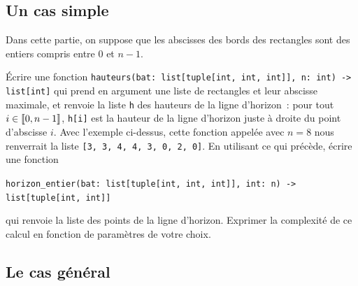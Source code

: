\documentclass{magnolia}
\begin{document}
\subsection{Un cas simple}

Dans cette partie, on suppose que les abscisses des bords des rectangles sont des entiers compris entre
0 et $n-1$.
\begin{questions}
\question Écrire une fonction \verb!hauteurs(bat: list[tuple[int, int, int]], n: int) -> list[int]! qui prend
  en argument une liste de rectangles et leur abscisse maximale, et renvoie la liste \verb!h! des hauteurs de la
  ligne d'horizon~: pour tout $i\in\left\llbracket 0,n-1\right\rrbracket$, \verb!h[i]! est la hauteur de la ligne d'horizon
  juste à droite du point d'abscisse $i$. Avec l'exemple ci-dessus, cette fonction appelée avec $n=8$ nous
  renverrait la liste \verb![3, 3, 4, 4, 3, 0, 2, 0]!.
\question En utilisant ce qui précède, écrire une fonction
\begin{center}
  \verb!horizon_entier(bat: list[tuple[int, int, int]], int: n) -> list[tuple[int, int]]!
\end{center}
qui renvoie la liste des points de la ligne d'horizon.
\question Exprimer la complexité de ce calcul en fonction de paramètres de votre choix.
\end{questions}

\subsection{Le cas général}
\end{document}
